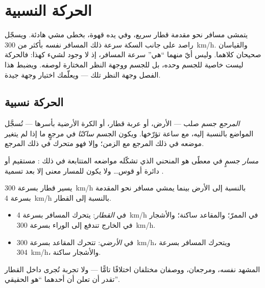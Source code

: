 \chapter{الحركة النسبية}\label{ch:g10:relative-motion}

يتمشى مسافر نحو مقدمة قطار سريع، وفي يده قهوة،
بخطى مشي هادئة. ويسجّل راصد على جانب السكة سرعة ذلك المسافر نفسه
بأكثر من \qty{300}{km/h}. والقياسان صحيحان كلاهما. وليس أيّ منهما
``هي'' سرعة المسافر، إذ لا وجود لشيء كهذا: فالحركة
ليست خاصية للجسم وحده، بل للجسم \emph{و}وجهة
النظر المختارة لوصفه. ويضبط هذا الفصل وجهة النظر تلك
--- ويعلّمك اختيار وجهة جيدة.

\section{الحركة نسبية}

\begin{definition}[المرجع]\label{def:g10:relative-motion:frame}
\emph{المرجع} جسم صلب --- الأرض،
أو عربة قطار، أو الكرة الأرضية بأسرها --- تُسجَّل المواضع بالنسبة إليه،
مع ساعة تؤرّخها. ويكون الجسم \emph{ساكنًا}
في مرجعٍ ما إذا لم يتغير موضعه في ذلك المرجع
مع الزمن؛ وإلا فهو متحرك في ذلك المرجع.
\end{definition}

\begin{definition}[المسار]\label{def:g10:relative-motion:trajectory}
\emph{مسار} جسمٍ في 
معطًى هو المنحني الذي تشكّله مواضعه المتتابعة في ذلك :
مستقيم أو دائرة أو قوس\dots{} ولا يكون للمسار معنى
إلا بعد تسمية .
\end{definition}

\begin{example}\label{ex:g10:relative-motion:walker}
يسير قطار بسرعة \qty{300}{km/h} بالنسبة إلى الأرض بينما يمشي
مسافر نحو المقدمة بسرعة \qty{4}{km/h} بالنسبة إلى القطار.
\begin{itemize}
  \item في  \emph{القطار}: يتحرك المسافر بسرعة \qty{4}{km/h}
        في الممرّ؛ والمقاعد ساكنة؛ والأشجار في الخارج تندفع
        إلى الوراء بسرعة \qty{300}{km/h}.
  \item في  \emph{الأرضي}: تتحرك المقاعد بسرعة \qty{300}{km/h}،
        ويتحرك المسافر بسرعة \qty{304}{km/h}، والأشجار ساكنة.
\end{itemize}
المشهد نفسه، ومرجعان، ووصفان مختلفان اختلافًا تامًّا --- ولا
تجربة تُجرى داخل القطار تقدر أن تعلن أن أحدهما ``هو
الحقيقي''.
\end{example}

